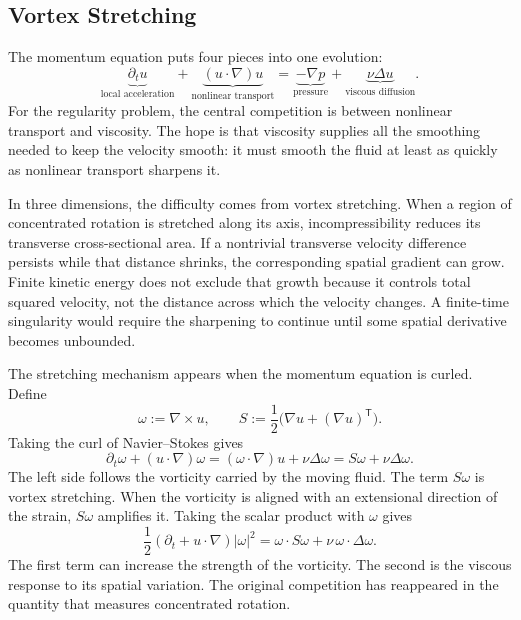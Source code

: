 \subsection{Vortex Stretching}\label{sub:ThePerfectlyStretchingVortex}

The momentum equation puts four pieces into one evolution:
\[
  \underbrace{\partial_tu}_{\text{local acceleration}}
  +
  \underbrace{(u\cdot\nabla)u}_{\text{nonlinear transport}}
  =
  \underbrace{-\nabla p}_{\text{pressure}}
  +
  \underbrace{\nu\Delta u}_{\text{viscous diffusion}}.
\]
For the regularity problem, the central competition is between nonlinear transport and viscosity.
The hope is that viscosity supplies all the smoothing needed to keep the velocity smooth: it must smooth the fluid at least as quickly as nonlinear transport sharpens it.

In three dimensions, the difficulty comes from vortex stretching.
When a region of concentrated rotation is stretched along its axis, incompressibility reduces its transverse cross-sectional area.
If a nontrivial transverse velocity difference persists while that distance shrinks, the corresponding spatial gradient can grow.
Finite kinetic energy does not exclude that growth because it controls total squared velocity, not the distance across which the velocity changes.
A finite-time singularity would require the sharpening to continue until some spatial derivative becomes unbounded.

The stretching mechanism appears when the momentum equation is curled.
Define
\[
  \omega:=\nabla\times u,
  \qquad
  S:=\frac12\bigl(\nabla u+(\nabla u)^{\mathsf T}\bigr).
\]
Taking the curl of Navier--Stokes gives
\begin{equation}\label{eq:VorticityEquation}
  \partial_t\omega+(u\cdot\nabla)\omega
  =(\omega\cdot\nabla)u+\nu\Delta\omega
  =S\omega+\nu\Delta\omega.
\end{equation}
The left side follows the vorticity carried by the moving fluid.
The term \(S\omega\) is vortex stretching.
When the vorticity is aligned with an extensional direction of the strain, \(S\omega\) amplifies it.
Taking the scalar product with \(\omega\) gives
\[
  \frac12(\partial_t+u\cdot\nabla)|\omega|^2
  =\omega\cdot S\omega
  +\nu\,\omega\cdot\Delta\omega.
\]
The first term can increase the strength of the vorticity.
The second is the viscous response to its spatial variation.
The original competition has reappeared in the quantity that measures concentrated rotation.

